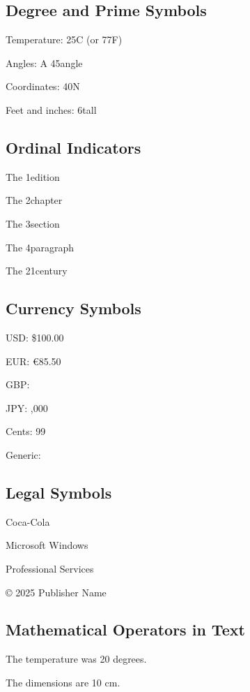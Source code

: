 \documentclass[11pt]{article}
\begin{document}
\subsection{Degree and Prime Symbols}

Temperature: 25\degrees C (or 77\degrees F)

Angles: A 45\degrees angle

Coordinates: 40\dblprimetext N

Feet and inches: 6\dblprimetext tall

\subsection{Ordinal Indicators}

The 1\ordst edition

The 2\ordnd chapter

The 3\ordrd section  

The 4\ordth paragraph

The 21\ordst century

\subsection{Currency Symbols}

USD: \$100.00

EUR: \euro 85.50

GBP: 

JPY: ,000

Cents: 99\cent

Generic: 

\subsection{Legal Symbols}

Coca-Cola\registered

Microsoft Windows\trademark

Professional Services\servicemark

\copyright{} 2025 Publisher Name

\subsection{Mathematical Operators in Text}

The temperature was 20 degrees.

The dimensions are 10 cm.
\end{document}

